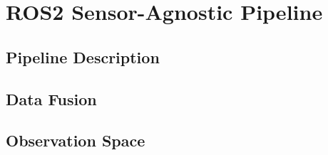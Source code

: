 \chapter{ROS2 Sensor-Agnostic Pipeline}
\label{ch:ros2}

\section{Pipeline Description}

\section{Data Fusion}

\section{Observation Space}
\label{sec:observation-space}

